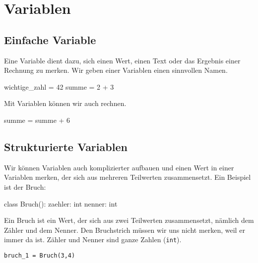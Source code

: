 \section{Variablen}

\subsection*{Einfache Variable}

Eine Variable dient dazu, sich einen Wert, einen Text oder das Ergebnis einer Rechnung zu merken. Wir geben einer Variablen einen sinnvollen Namen.

\begin{codePython}
wichtige_zahl = 42
summe = 2 + 3
\end{codePython}

Mit Variablen können wir auch rechnen.

\begin{codePython}
summe = summe + 6
\end{codePython}

\subsection*{Strukturierte Variablen}

Wir können Variablen auch komplizierter aufbauen und einen Wert in einer Variablen merken, der sich aus mehreren Teilwerten zusammensetzt. Ein Beispiel ist der Bruch:

\begin{codePython}
class Bruch():
	zaehler: int
	nenner: int
\end{codePython}

Ein Bruch ist ein Wert, der sich aus zwei Teilwerten zusammensetzt, nämlich dem Zähler und dem Nenner. Den Bruchstrich müssen wir uns nicht merken, weil er immer da ist. Zähler und Nenner sind ganze Zahlen (\texttt{int}).

\begin{lstlisting}
bruch_1 = Bruch(3,4)
\end{lstlisting}

